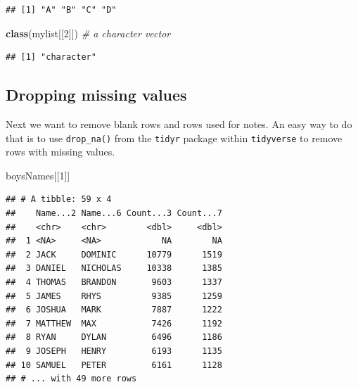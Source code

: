 \documentclass[]{book}
\newenvironment{Shaded}{\begin{snugshade}}{\end{snugshade}}
\newcommand{\CommentTok}[1]{\textcolor[rgb]{0.56,0.35,0.01}{\textit{#1}}}
\newcommand{\DecValTok}[1]{\textcolor[rgb]{0.00,0.00,0.81}{#1}}
\newcommand{\KeywordTok}[1]{\textcolor[rgb]{0.13,0.29,0.53}{\textbf{#1}}}
\newcommand{\NormalTok}[1]{#1}
\newcommand{\OperatorTok}[1]{\textcolor[rgb]{0.81,0.36,0.00}{\textbf{#1}}}
\newcommand{\StringTok}[1]{\textcolor[rgb]{0.31,0.60,0.02}{#1}}
\begin{document}
\begin{verbatim}
## [1] "A" "B" "C" "D"
\end{verbatim}

\begin{Shaded}
\begin{Highlighting}[]
\KeywordTok{class}\NormalTok{(mylist[[}\DecValTok{2}\NormalTok{]]) }\CommentTok{# a character vector}
\end{Highlighting}
\end{Shaded}

\begin{verbatim}
## [1] "character"
\end{verbatim}

\hypertarget{dropping-missing-values}{%
\subsection{Dropping missing values}\label{dropping-missing-values}}

Next we want to remove blank rows and rows used for notes. An easy way
to do that is to use \texttt{drop\_na()} from the \texttt{tidyr} package within \texttt{tidyverse}
to remove rows with missing values.

\begin{Shaded}
\begin{Highlighting}[]
\NormalTok{boysNames[[}\DecValTok{1}\NormalTok{]]}
\end{Highlighting}
\end{Shaded}

\begin{verbatim}
## # A tibble: 59 x 4
##    Name...2 Name...6 Count...3 Count...7
##    <chr>    <chr>        <dbl>     <dbl>
##  1 <NA>     <NA>            NA        NA
##  2 JACK     DOMINIC      10779      1519
##  3 DANIEL   NICHOLAS     10338      1385
##  4 THOMAS   BRANDON       9603      1337
##  5 JAMES    RHYS          9385      1259
##  6 JOSHUA   MARK          7887      1222
##  7 MATTHEW  MAX           7426      1192
##  8 RYAN     DYLAN         6496      1186
##  9 JOSEPH   HENRY         6193      1135
## 10 SAMUEL   PETER         6161      1128
## # ... with 49 more rows
\end{verbatim}

\begin{Shaded}
\end{Shaded}
\end{document}
